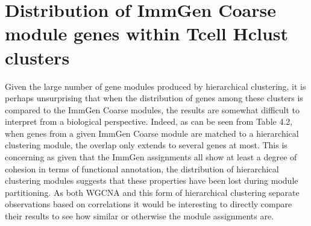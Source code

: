 \section{Distribution of ImmGen Coarse module genes within Tcell Hclust clusters}

Given the large number of gene modules produced by hierarchical clustering, it is perhaps unsurprising that when the distribution of genes among these clusters is compared to the ImmGen Coarse modules, the results are somewhat difficult to interpret from a biological perspective. Indeed, as can be seen from Table 4.2, when genes from a given ImmGen Coarse module are matched to a hierarchical clustering module, the overlap only extends to several genes at most. This is concerning as given that the ImmGen assignments all show at least a degree of cohesion in terms of functional annotation, the distribution of hierarchical clustering modules suggests that these properties have been lost during module partitioning. As both WGCNA and this form of hierarchical clustering separate observations based on correlations it would be interesting to directly compare their results to see how similar or otherwise the module assignments are.  

